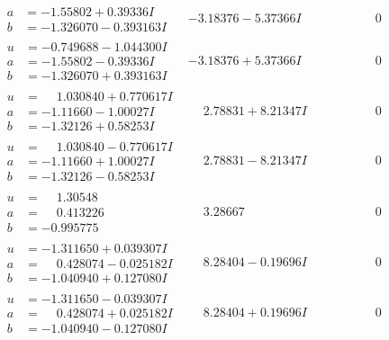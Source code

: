 \documentclass[1p]{elsarticle_modified}
\theoremstyle{definition}
\begin{document}
$$\begin{array}{c|c|c}
\begin{aligned}
a &= -1.55802 + 0.39336 I \\
b &= -1.326070 - 0.393163 I\end{aligned}
 & -3.18376 - 5.37366 I & \phantom{-0.000000 } 0 \\ \hline\begin{aligned}
u &= -0.749688 - 1.044300 I \\
a &= -1.55802 - 0.39336 I \\
b &= -1.326070 + 0.393163 I\end{aligned}
 & -3.18376 + 5.37366 I & \phantom{-0.000000 } 0 \\ \hline\begin{aligned}
u &= \phantom{-}1.030840 + 0.770617 I \\
a &= -1.11660 - 1.00027 I \\
b &= -1.32126 + 0.58253 I\end{aligned}
 & \phantom{-}2.78831 + 8.21347 I & \phantom{-0.000000 } 0 \\ \hline\begin{aligned}
u &= \phantom{-}1.030840 - 0.770617 I \\
a &= -1.11660 + 1.00027 I \\
b &= -1.32126 - 0.58253 I\end{aligned}
 & \phantom{-}2.78831 - 8.21347 I & \phantom{-0.000000 } 0 \\ \hline\begin{aligned}
u &= \phantom{-}1.30548\phantom{ +0.000000I} \\
a &= \phantom{-}0.413226\phantom{ +0.000000I} \\
b &= -0.995775\phantom{ +0.000000I}\end{aligned}
 & \phantom{-}3.28667\phantom{ +0.000000I} & \phantom{-0.000000 } 0 \\ \hline\begin{aligned}
u &= -1.311650 + 0.039307 I \\
a &= \phantom{-}0.428074 - 0.025182 I \\
b &= -1.040940 + 0.127080 I\end{aligned}
 & \phantom{-}8.28404 - 0.19696 I & \phantom{-0.000000 } 0 \\ \hline\begin{aligned}
u &= -1.311650 - 0.039307 I \\
a &= \phantom{-}0.428074 + 0.025182 I \\
b &= -1.040940 - 0.127080 I\end{aligned}
 & \phantom{-}8.28404 + 0.19696 I & \phantom{-0.000000 } 0 \\ \hline\begin{aligned}

\end{aligned}
\end{array}$$
\end{document}
